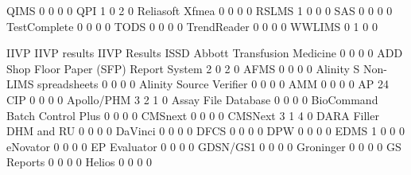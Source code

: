 \documentclass{article}
\begin{document}
\begin{Schunk}
\begin{Soutput}
  QIMS                                                       0    0   0   0
  QPI                                                        1    0   2   0
  Reliasoft Xfmea                                            0    0   0   0
  RSLMS                                                      1    0   0   0
  SAS                                                        0    0   0   0
  TestComplete                                               0    0   0   0
  TODS                                                       0    0   0   0
  TrendReader                                                0    0   0   0
  WWLIMS                                                     0    1   0   0
                                          
                                           IIVP IIVP results IIVP Results ISSD
  Abbott Transfusion Medicine                 0            0            0    0
  ADD Shop Floor Paper (SFP) Report System    2            0            2    0
  AFMS                                        0            0            0    0
  Alinity S Non-LIMS spreadsheets             0            0            0    0
  Alinity Source Verifier                     0            0            0    0
  AMM                                         0            0            0    0
  AP 24 CIP                                   0            0            0    0
  Apollo/PHM                                  3            2            1    0
  Assay File Database                         0            0            0    0
  BioCommand Batch Control Plus               0            0            0    0
  CMSnext                                     0            0            0    0
  CMSNext                                     3            1            4    0
  DARA Filler DHM and RU                      0            0            0    0
  DaVinci                                     0            0            0    0
  DFCS                                        0            0            0    0
  DPW                                         0            0            0    0
  EDMS                                        1            0            0    0
  eNovator                                    0            0            0    0
  EP Evaluator                                0            0            0    0
  GDSN/GS1                                    0            0            0    0
  Groninger                                   0            0            0    0
  GS Reports                                  0            0            0    0
  Helios                                      0            0            0    0

\end{Soutput}
\end{Schunk}
\end{document}
